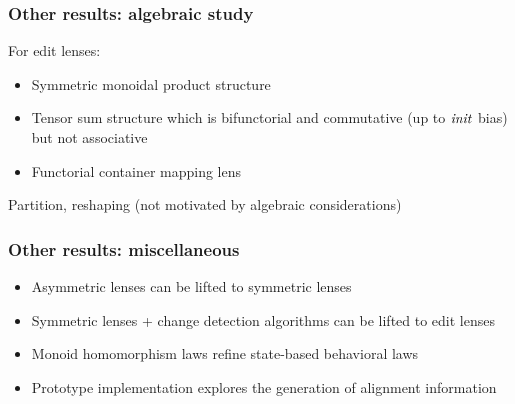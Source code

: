 \documentclass[table]{beamer}
\begin{document}
\begin{frame}
    \frametitle{Other results: algebraic study}
    For edit lenses:
    \begin{itemize}
        \item Symmetric monoidal product structure
        \item Tensor sum structure which is bifunctorial and commutative (up
            to $\mathit{init}$ bias) but not associative
        \item Functorial container mapping lens
    \end{itemize}
    Partition, reshaping (not motivated by algebraic considerations)
\end{frame}

\begin{frame}
    \frametitle{Other results: miscellaneous}
    \begin{itemize}
        \item Asymmetric lenses can be lifted to symmetric lenses
        \item Symmetric lenses + change detection algorithms can be lifted
            to edit lenses
        \item Monoid homomorphism laws refine state-based behavioral laws
        \item Prototype implementation explores the generation of alignment
            information
    \end{itemize}
\end{frame}
\end{document}
